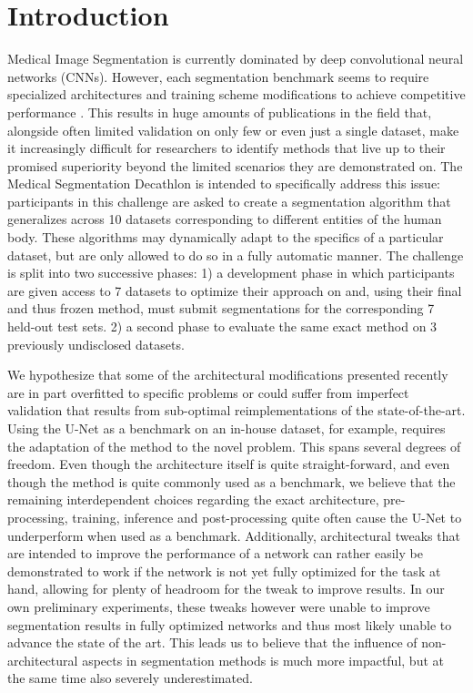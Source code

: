 \documentclass{templates/llncs} %
\begin{document}
\section{Introduction}
    Medical Image Segmentation is currently dominated by deep convolutional neural networks (CNNs). However, each segmentation benchmark seems to require specialized architectures and training scheme modifications to achieve competitive performance \cite{isensee2017brain,li2017h,roy2018concurrent,oktay2018attention,jegou2017one}. This results in huge amounts of publications in the field that, alongside often limited validation on only few or even just a single dataset, make it increasingly difficult for researchers to identify methods that live up to their promised superiority beyond the limited scenarios they are demonstrated on. The Medical Segmentation Decathlon is intended to specifically address this issue: participants in this challenge are asked to create a segmentation algorithm that generalizes across 10 datasets corresponding to different entities of the human body. These algorithms may dynamically adapt to the specifics of a particular dataset, but are only allowed to do so in a fully automatic manner. The challenge is split into two successive phases: 1) a development phase in which participants are given access to 7 datasets to optimize their approach on and, using their final and thus frozen method, must submit segmentations for the corresponding 7 held-out test sets. 2) a second phase to evaluate the same exact method on 3 previously undisclosed datasets.
    
    We hypothesize that some of the architectural modifications presented recently are in part overfitted to specific problems or could suffer from imperfect validation that results from sub-optimal reimplementations of the state-of-the-art. Using the U-Net as a benchmark on an in-house dataset, for example, requires the adaptation of the method to the novel problem. This spans several degrees of freedom. Even though the architecture itself is quite straight-forward, and even though the method is quite commonly used as a benchmark, we believe that the remaining interdependent choices regarding the exact architecture, pre-processing, training, inference and post-processing quite often cause the U-Net to underperform when used as a benchmark. Additionally, architectural tweaks that are intended to improve the performance of a network can rather easily be demonstrated to work if the network is not yet fully optimized for the task at hand, allowing for plenty of headroom for the tweak to improve results. In our own preliminary experiments, these tweaks however were unable to improve segmentation results in fully optimized networks and thus most likely unable to advance the state of the art. This leads us to believe that the influence of non-architectural aspects in segmentation methods is much more impactful, but at the same time also severely underestimated. 
    
\end{document}
